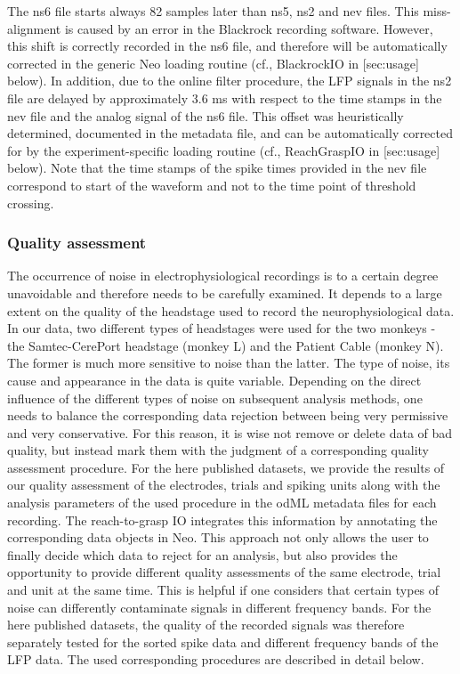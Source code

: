 The ns6 file starts always 82 samples later than ns5, ns2 and nev files. This miss-alignment is caused by an error in the Blackrock recording software. However, this shift is correctly recorded in the ns6 file, and therefore will be automatically corrected in the generic Neo loading routine (cf., BlackrockIO in [sec:usage] below). In addition, due to the online filter procedure, the LFP signals in the ns2 file are delayed by approximately 3.6 ms with respect to the time stamps in the nev file and the analog signal of the ns6 file. This offset was heuristically determined, documented in the metadata file, and can be automatically corrected for by the experiment-specific loading routine (cf., ReachGraspIO in [sec:usage] below). Note that the time stamps of the spike times provided in the nev file correspond to start of the waveform and not to the time point of threshold crossing.

\subsubsection{Quality assessment}

The occurrence of noise in electrophysiological recordings is to a certain degree unavoidable and therefore needs to be carefully examined. It depends to a large extent on the quality of the headstage used to record the neurophysiological data. In our data, two different types of headstages were used for the two monkeys - the Samtec-CerePort headstage (monkey L) and the Patient Cable (monkey N). The former is much more sensitive to noise than the latter. The type of noise, its cause and appearance in the data is quite variable. Depending on the direct influence of the different types of noise on subsequent analysis methods, one needs to balance the corresponding data rejection between being very permissive and very conservative. For this reason, it is wise not remove or delete data of bad quality, but instead mark them with the judgment of a corresponding quality assessment procedure. For the here published datasets, we provide the results of our quality assessment of the electrodes, trials and spiking units along with the analysis parameters of the used procedure in the odML metadata files for each recording. The reach-to-grasp IO integrates this information by annotating the corresponding data objects in Neo. This approach not only allows the user to finally decide which data to reject for an analysis, but also provides the opportunity to provide different quality assessments of the same electrode, trial and unit at the same time. This is helpful if one considers that certain types of noise can differently contaminate signals in different frequency bands. For the here published datasets, the quality of the recorded signals was therefore separately tested for the sorted spike data and different frequency bands of the LFP data. The used corresponding procedures are described in detail below. 

